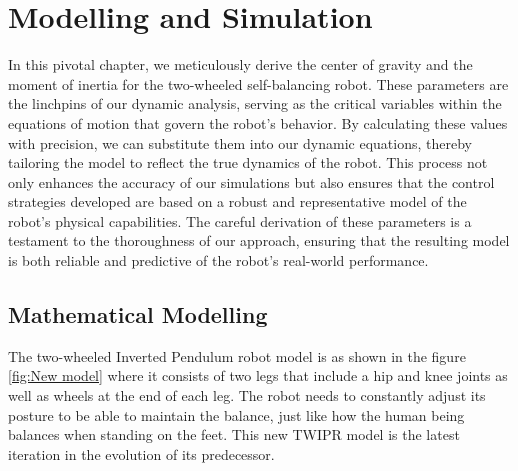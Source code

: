\chapter{Modelling and Simulation}

\graphicspath{{./Figures/Modelling and Simulation}}

In this pivotal chapter, we meticulously derive the center of gravity and the moment of inertia for the two-wheeled self-balancing robot.
These parameters are the linchpins of our dynamic analysis, serving as the critical variables within the equations of motion that govern the robot's behavior.
By calculating these values with precision, we can substitute them into our dynamic equations, thereby tailoring the model to reflect the true dynamics of the robot.
This process not only enhances the accuracy of our simulations but also ensures that the control strategies developed are based on a robust and representative model of the robot's physical capabilities.
The careful derivation of these parameters is a testament to the thoroughness of our approach, ensuring that the resulting model is both reliable and predictive of the robot's real-world performance.
\newpage

\section{Mathematical Modelling}

The two-wheeled Inverted Pendulum robot model is as shown in the figure  \ref{fig:New model} where it consists of two legs that include a hip and knee joints as well as wheels at the end of each leg.
The robot needs to constantly adjust its posture to be able to maintain the balance, just like how the human being balances when standing on the feet.
This new TWIPR model is the latest iteration in the evolution of its predecessor.

